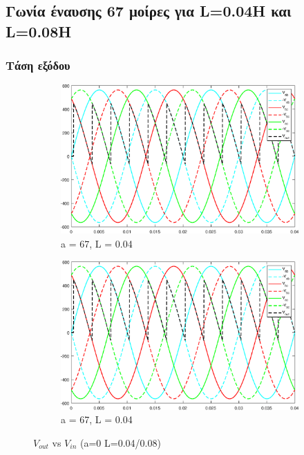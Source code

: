 \subsection{Γωνία έναυσης 67 μοίρες για L=0.04Η και L=0.08Η}

\subsubsection{Τάση εξόδου}

\begin{figure}[h]
	\centering
	\begin{subfigure}{.5\textwidth}
		\centering
		\includegraphics[width = 0.9\linewidth]{Images/3_Vout_67_04}
		\caption{a = 67, L = 0.04}
		\label{fig:3_vout_67_04}
	\end{subfigure}%
	\begin{subfigure}{.5\textwidth}
		\centering
		\includegraphics[width = 0.9\linewidth]{Images/3_Vout_67_08}
		\caption{a = 67, L = 0.04}
		\label{fig:3_vout_67_08}
	\end{subfigure}
	\caption{$V_{out} $ vs $V_{in}$ (a=0 L=0.04/0.08)}
	\label{figs:3_vout_67}
\end{figure}

